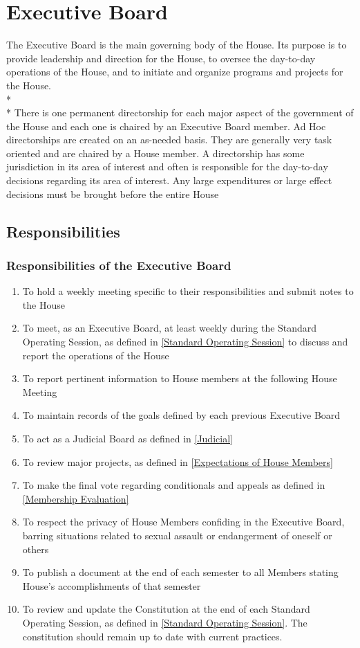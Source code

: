 \documentclass{article}
\newcommand{\article}[1]{\section{#1} \label{#1}}
\newcommand{\asection}[1]{\subsection{#1} \label{#1}}
\newcommand{\asubsection}[1]{\subsubsection{#1} \label{#1}}
\begin{document}
\article{Executive Board}
The Executive Board is the main governing body of the House.
Its purpose is to provide leadership and direction for the House, to oversee the day-to-day operations of the House, and to initiate and organize programs and projects for the House.
\\*\\*
There is one permanent directorship for each major aspect of the government of the House and each one is chaired by an Executive Board member.
Ad Hoc directorships are created on an as-needed basis.
They are generally very task oriented and are chaired by a House member.
A directorship has some jurisdiction in its area of interest and often is responsible for the day-to-day decisions regarding its area of interest.
Any large expenditures or large effect decisions must be brought before the entire House

\asection{Responsibilities}

\renewcommand{\theenumi}{\alph{enumi}} %
\asubsection{Responsibilities of the Executive Board}
\begin{enumerate}
	\item To hold a weekly meeting specific to their responsibilities and submit notes to the House
	\item To meet, as an Executive Board, at least weekly during the Standard Operating Session, as defined in \ref{Standard Operating Session} to discuss and report the operations of the House
	\item To report pertinent information to House members at the following House Meeting
	\item To maintain records of the goals defined by each previous Executive Board
	\item To act as a Judicial Board as defined in \ref{Judicial}
	\item To review major projects, as defined in \ref{Expectations of House Members}
	\item To make the final vote regarding conditionals and appeals as defined in \ref{Membership Evaluation}
	\item To respect the privacy of House Members confiding in the Executive Board, barring situations related to sexual assault or endangerment of oneself or others
	\item To publish a document at the end of each semester to all Members stating House’s accomplishments of that semester
	\item To review and update the Constitution at the end of each Standard Operating Session, as defined in \ref{Standard Operating Session}.
		The constitution should remain up to date with current practices.
\end{enumerate}
\end{document}
